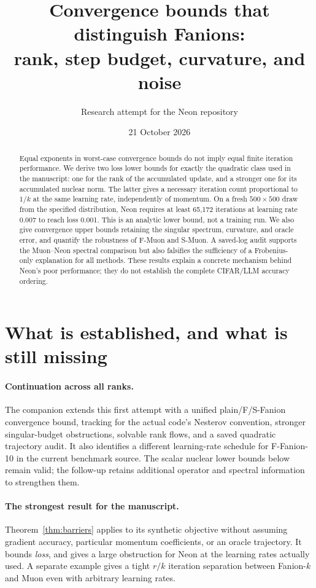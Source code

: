 \documentclass[11pt]{article}
\title{Convergence bounds that distinguish Fanions:\\rank, step budget, curvature, and noise}
\author{Research attempt for the Neon repository}
\date{21 October 2026}
\begin{document}
\maketitle

\begin{abstract}
Equal exponents in worst-case convergence bounds do not imply equal finite
iteration performance. We derive two loss lower bounds for exactly the
quadratic class used in the manuscript: one for the rank of the accumulated
update, and a stronger one for its accumulated nuclear norm. The latter gives
a necessary iteration count proportional to $1/k$ at the same learning rate,
independently of momentum. On a fresh $500\times500$ draw from the specified
distribution, Neon requires at least 65,172 iterations at learning rate 0.007
to reach loss 0.001. This is an analytic lower bound, not a training run.
We also give convergence upper bounds retaining the singular spectrum,
curvature, and oracle error, and quantify the robustness of F-Muon and S-Muon.
A saved-log audit supports the Muon--Neon spectral comparison but also
falsifies the sufficiency of a Frobenius-only explanation for all methods.
These results explain a concrete mechanism behind Neon's poor performance;
they do not establish the complete CIFAR/LLM accuracy ordering.
\end{abstract}

\section{What is established, and what is still missing}

\paragraph{Continuation across all ranks.}
The companion  extends this first attempt with a
unified plain/F/S-Fanion convergence bound, tracking for the actual code's
Nesterov convention, stronger singular-budget obstructions, solvable rank
flows, and a saved quadratic trajectory audit. It also identifies a
different learning-rate schedule for F-Fanion-10 in the current benchmark
source. The scalar nuclear lower bounds below remain valid; the follow-up
retains additional operator and spectral information to strengthen them.

\paragraph{The strongest result for the manuscript.}
Theorem~\ref{thm:barriers} applies to its synthetic objective without assuming
gradient accuracy, particular momentum coefficients, or an oracle trajectory.
It bounds \emph{loss}, and gives a large obstruction for Neon at the learning
rates actually used. A separate example gives a tight $r/k$ iteration
separation between Fanion-$k$ and Muon even with arbitrary learning rates.
\end{document}

